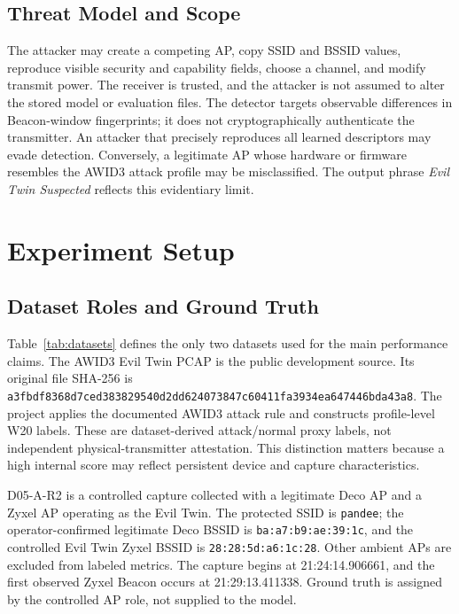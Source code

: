 \documentclass[conference]{IEEEtran}
\begin{document}
\subsection{Threat Model and Scope}

The attacker may create a competing AP, copy SSID and BSSID values, reproduce visible security and capability fields, choose a channel, and modify transmit power. The receiver is trusted, and the attacker is not assumed to alter the stored model or evaluation files. The detector targets observable differences in Beacon-window fingerprints; it does not cryptographically authenticate the transmitter. An attacker that precisely reproduces all learned descriptors may evade detection. Conversely, a legitimate AP whose hardware or firmware resembles the AWID3 attack profile may be misclassified. The output phrase \emph{Evil Twin Suspected} reflects this evidentiary limit.

\section{Experiment Setup}
\label{sec:method}

\subsection{Dataset Roles and Ground Truth}

Table~\ref{tab:datasets} defines the only two datasets used for the main performance claims. The AWID3 Evil Twin PCAP is the public development source. Its original file SHA-256 is \texttt{a3fbdf8368d7ced3\allowbreak{}83829540d2dd6240\allowbreak{}73847c60411fa393\allowbreak{}4ea647446bda43a8}. The project applies the documented AWID3 attack rule and constructs profile-level W20 labels. These are dataset-derived attack/normal proxy labels, not independent physical-transmitter attestation. This distinction matters because a high internal score may reflect persistent device and capture characteristics.

D05-A-R2 is a controlled capture collected with a legitimate Deco AP and a Zyxel AP operating as the Evil Twin. The protected SSID is \texttt{pandee}; the operator-confirmed legitimate Deco BSSID is \texttt{ba:a7:b9:ae:39:1c}, and the controlled Evil Twin Zyxel BSSID is \texttt{28:28:5d:a6:1c:28}. Other ambient APs are excluded from labeled metrics. The capture begins at 21:24:14.906661, and the first observed Zyxel Beacon occurs at 21:29:13.411338. Ground truth is assigned by the controlled AP role, not supplied to the model.
\end{document}
